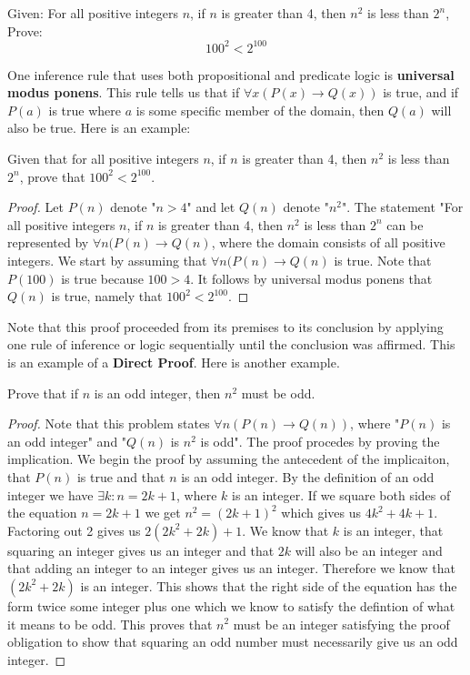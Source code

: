Given:
For all positive integers $n$, if $n$ is greater than 4, then $n^2$ is less than $2^n$,
Prove:
$$100^2 < 2^{100}$$


One inference rule that uses both propositional and predicate logic is \textbf{universal modus ponens}. This rule tells us that if $\forall x(P(x) \rightarrow Q(x))$ is true, and if $P(a)$ is true where $a$ is some specific member of the domain, then $Q(a)$ will also be true. Here is an example:

\begin{example}
Given that for all positive integers $n$, if $n$ is greater than 4, then $n^2$ is less than $2^n$, prove that $100^2 < 2^{100}$.
\begin{proof}
Let $P(n)$ denote "$n>4$" and let $Q(n)$ denote "$n^2$". The statement "For all positive integers $n$, if $n$ is greater than 4, then $n^2$ is less than $2^n$ can be represented by $\forall n(P(n) \rightarrow Q(n)$, where the domain consists of all positive integers. We start by assuming that $\forall n(P(n) \rightarrow Q(n)$ is true. Note that $P(100)$ is true because $100 > 4$. It follows by universal modus ponens that $Q(n)$ is true, namely that $100^2 < 2^{100}$. 
\end{proof}
 \end{example}
 
Note that this proof proceeded from its premises to its conclusion by applying one rule of inference or logic sequentially until the conclusion was affirmed. This is an example of a \textbf{Direct Proof}. Here is another example.

\begin{example}
Prove that if $n$ is an odd integer, then $n^2$ must be odd.
\begin{proof}
Note that this problem states $\forall n (P(n) \rightarrow Q(n))$, where "$P(n)$ is an odd integer" and "$Q(n)$ is $n^2$ is odd". The proof procedes by proving the implication. We begin the proof by assuming the antecedent of the implicaiton, that $P(n)$ is true and that $n$ is an odd integer. By the definition of an odd integer we have $\exists k : n=2k+1$, where $k$ is an integer. If we square both sides of the equation $n=2k+1$ we get $n^2=(2k+1)^2$ which gives us $4k^2+4k+1$. Factoring out 2 gives us $2(2k^2+2k) + 1$. We know that $k$ is an integer, that squaring an integer gives us an integer and that $2k$ will also be an integer and that adding an integer to an integer gives us an integer. Therefore we know that $(2k^2+2k)$ is an integer. This shows that the right side of the equation has the form twice some integer plus one which we know to satisfy the defintion of what it means to be odd. This proves that $n^2$ must be an integer satisfying the proof obligation to show that squaring an odd number must necessarily give us an odd integer. 
\end{proof}
\end{example}

